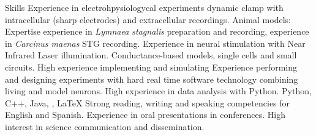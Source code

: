 \begin{rubric}{Skills}
\entry*[Electrophysiology]
	Experience in electrohpysiologycal experiments dynamic clamp with intracellular (sharp electrodes) and extracellular recordings. Animal models: Expertise experience in \textit{Lymnaea stagnalis} preparation and recording, experience in \textit{Carcinus maenas} STG recording.
    Experience in neural stimulation with Near Infrared Laser illumination.
    Conductance-based models, single cells and small circuits. High experience implementing and simulating 
 Experience performing and designing experiments with hard real time software technology combining living and model neurons. 
    High experience in data analysis with Python.
	Python, C++, Java, , \LaTeX
\entry*[Languages]
	Strong reading, writing and speaking competencies for English and Spanish.
 Experience in oral presentations in conferences. High interest in science communication and dissemination.

\end{rubric}
